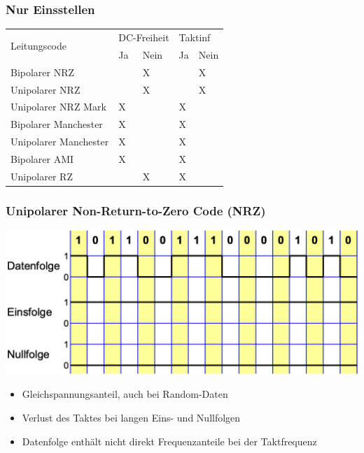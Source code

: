 \subsubsection{Nur Einsstellen}
    \begin{tabular}{|l|l|l|l|l|}
        \hline
        \multirow{2}{*}{Leitungscode} & \multicolumn{2}{l|}{DC-Freiheit} & \multicolumn{2}{l|}{Taktinf} \\ \cline{2-5}
        & Ja             & Nein            & Ja               & Nein              \\ \hline
        Bipolarer NRZ            &                & X               &                  & X                 \\ \hline
        Unipolarer NRZ           &                & X               &                  & X                 \\ \hline
        Unipolarer NRZ Mark      & X              &                 & X                &                   \\ \hline
        Bipolarer Manchester     & X              &                 & X                &                   \\ \hline
        Unipolarer Manchester    & X              &                 & X                &                   \\ \hline
        Bipolarer AMI            & X              &                 & X                &                   \\ \hline
        Unipolarer RZ			 &				  & X		       & X				&					\\ \hline
    \end{tabular}

\subsubsection{Unipolarer Non-Return-to-Zero Code (NRZ)}
\begin{center}
    \includegraphics[width=\linewidth]{graphic/signale_analyisieren/Unipolarer Non-Return-to-Zero Code (NRZ).png}
\end{center}
\vspace{-8pt}
\begin{itemize}
    \item Gleichspannungsanteil, auch bei Random-Daten
    \item Verlust des Taktes bei langen Eins- und Nullfolgen
    \item Datenfolge enthält nicht direkt Frequenzanteile bei der Taktfrequenz
\end{itemize}


